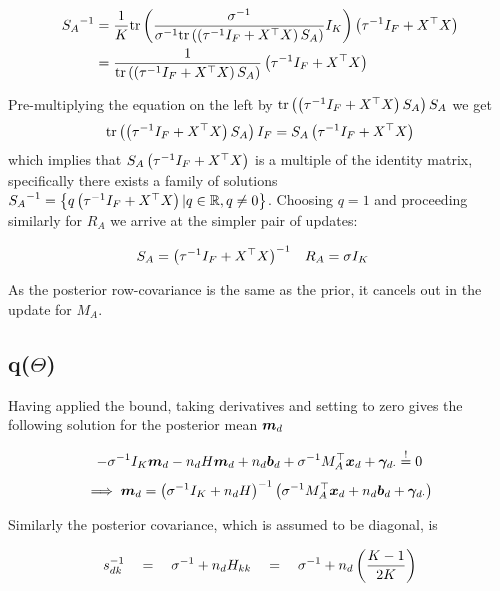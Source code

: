 \begin{align}
{S_A}^{-1} & = \frac{1}{ {K} } \text{tr} \left( {
    \frac{
        {\sigma}^{-1} 
     } {
         {\sigma}^{-1} \text{tr} \left( {\left({\tau}^{-1} I_F + X^\top X \right) S_A} \right)
     }
     I_K
} \right) \left({\tau}^{-1} I_F + X^\top X \right) \\
 &= \frac{1}{ {
         \text{tr} \left( {\left({\tau}^{-1} I_F + X^\top X \right) S_A} \right)
     } } \left({\tau}^{-1} I_F + X^\top X \right)
\end{align}

Pre-multiplying the equation on the left by $\text{tr} \left( {\left({\tau}^{-1} I_F + X^\top X \right) S_A} \right) S_A$ we get
\begin{align}
 \text{tr} \left( {\left({\tau}^{-1} I_F + X^\top X \right) S_A} \right) I_F = S_A \left({\tau}^{-1} I_F + X^\top X \right)
\end{align}
which implies that $S_A \left({\tau}^{-1} I_F + X^\top X \right)$ is a multiple of the identity matrix, 
specifically there exists a family of solutions ${S_A}^{-1} = \left\{ q\left({\tau}^{-1} I_F + X^\top X \right) | q \in \mathbb{R}, q \neq 0 \right\}$. 
Choosing $q = 1$ and proceeding similarly for $R_A$ we arrive at the simpler pair of updates:

\begin{align}
S_A & = {\left( {\tau}^{-1} I_F + X^\top X \right)}^{-1} &
R_A & = \sigma I_K
\end{align}

As the posterior row-covariance is the same as the prior, it cancels out in the update for $M_A$. 

\subsection{q($\Theta$)}
Having applied the bound, taking derivatives and setting to zero gives the following solution for the posterior mean $\bm m_d$

\begin{align}
- {\sigma}^{-1} I_K \bm m_d - n_d H \bm m_d + n_d \bm b_d + {\sigma}^{-1} M_A^\top{  \bm x _d } + \bm \gamma_{d\cdot} \overset{!}{=} 0
\end{align}
\begin{align}
\implies \bm m_d = {\left( {\sigma}^{-1} I_K + n_d H \right)}^{-1}\left({\sigma}^{-1} M_A^\top{  \bm x _d } + n_d \bm b_d + \bm \gamma_{d\cdot} \right)
\end{align}

Similarly the posterior covariance, which is assumed to be diagonal, is

\begin{align}
s_{dk}^{-1} \quad =  \quad {\sigma}^{-1} + n_d H_{kk} \quad = \quad {\sigma}^{-1} + n_d \left(\frac{K-1}{2K}\right)
\end{align}

